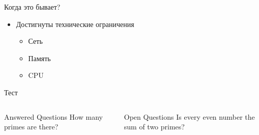 \documentclass[aspectratio=169]{beamer}
\begin{document}
\begin{frame}{Когда это бывает?}
    \begin{itemize}
        \pause
        \item Достигнуты технические ограничения
            \begin{itemize}
                \pause
                \item Сеть
                
                \pause
                \item Память
                
                \pause
                \item CPU
            \end{itemize}
    \end{itemize}
\end{frame}

\begin{frame}

\end{frame}

\begin{frame}{Тест}
    \begin{columns}
        \begin{block}{Answered Questions}
            How many primes are there?
        \end{block}

        \begin{block}{Open Questions}
            Is every even number the sum of two primes?
        \end{block}
    \end{columns}
\end{frame}




\end{document}
